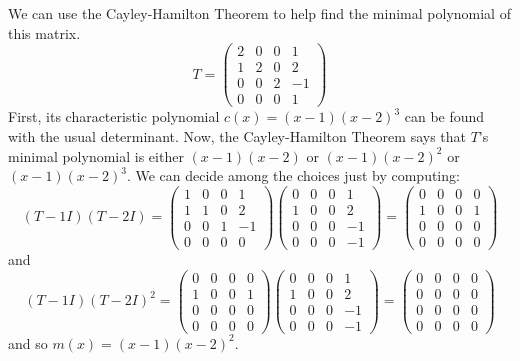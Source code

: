 \begin{example} \label{ex:MinPolyUsingCH}
We can use the Cayley-Hamilton Theorem to help find the minimal polynomial of
this matrix.
\begin{equation*}
   T=
   \begin{pmatrix}
      2  &0  &0  &1  \\
      1  &2  &0  &2  \\
      0  &0  &2  &-1 \\
      0  &0  &0  &1
   \end{pmatrix}
\end{equation*}
First, its characteristic polynomial \( c(x)=(x-1)(x-2)^3 \)
can be found with the usual determinant.
Now, the Cayley-Hamilton Theorem says that 
\( T \)'s minimal polynomial is either
\( (x-1)(x-2) \) or
\( (x-1)(x-2)^2 \) or
\( (x-1)(x-2)^3 \).
We can decide among the choices just by computing:
\begin{equation*}
   (T-1I)(T-2I)=\!
   \begin{pmatrix}
      1  &0  &0  &1  \\
      1  &1  &0  &2  \\
      0  &0  &1  &-1 \\
      0  &0  &0  &0
   \end{pmatrix}
   \begin{pmatrix}
      0  &0  &0  &1  \\
      1  &0  &0  &2  \\
      0  &0  &0  &-1 \\
      0  &0  &0  &-1
   \end{pmatrix}
   =
   \begin{pmatrix}
      0  &0  &0  &0  \\
      1  &0  &0  &1  \\
      0  &0  &0  &0  \\
      0  &0  &0  &0
   \end{pmatrix}
\end{equation*}
and
\begin{equation*}
   (T-1I)(T-2I)^2=
   \begin{pmatrix}
      0  &0  &0  &0  \\
      1  &0  &0  &1  \\
      0  &0  &0  &0  \\
      0  &0  &0  &0
   \end{pmatrix}
   \begin{pmatrix}
      0  &0  &0  &1  \\
      1  &0  &0  &2  \\
      0  &0  &0  &-1 \\
      0  &0  &0  &-1
   \end{pmatrix}
   =
   \begin{pmatrix}
      0  &0  &0  &0  \\
      0  &0  &0  &0  \\
      0  &0  &0  &0  \\
      0  &0  &0  &0
   \end{pmatrix}
\end{equation*}
and so \( m(x)=(x-1)(x-2)^2 \).
\end{example}



